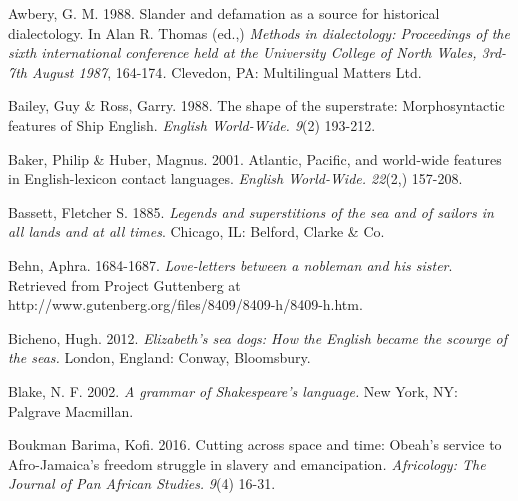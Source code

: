 \begin{styleStandard}
Awbery, G. M. 1988. Slander and defamation as a source for historical dialectology. In Alan R. Thomas (ed.,) \textit{Methods in dialectology: Proceedings of the sixth international conference held at the University College of North Wales, 3rd-7th August 1987}, 164-174\textit{.} Clevedon, PA: Multilingual Matters Ltd.
\end{styleStandard}


\begin{styleStandard}
Bailey, Guy \& Ross, Garry. 1988. The shape of the superstrate: Morphosyntactic features of Ship English. \textit{English World-Wide. 9}(2) 193-212.
\end{styleStandard}


\begin{styleStandard}
Baker, Philip \& Huber, Magnus. 2001. Atlantic, Pacific, and world-wide features in English-lexicon contact languages. \textit{English World-Wide. 22}(2,) 157-208.
\end{styleStandard}


\begin{styleStandard}
Bassett, Fletcher S. 1885. \textit{Legends and superstitions of the sea and of sailors in all lands and at all times}. Chicago, IL: Belford, Clarke \& Co. 
\end{styleStandard}


\begin{styleStandard}
Behn, Aphra. 1684-1687. \textit{Love-letters between a nobleman and his sister}. Retrieved from Project Guttenberg at http://www.gutenberg.org/files/8409/8409-h/8409-h.htm.
\end{styleStandard}


\begin{styleStandard}
Bicheno, Hugh. 2012. \textit{Elizabeth’s sea dogs: How the English became the scourge of the seas. }London, England: Conway, Bloomsbury.
\end{styleStandard}


\begin{styleStandard}
Blake, N. F. 2002. \textit{A grammar of Shakespeare’s language. }New York, NY: Palgrave Macmillan.
\end{styleStandard}


\begin{styleStandard}
Boukman Barima, Kofi. 2016\textit{. }Cutting across space and time: Obeah’s service to Afro-Jamaica’s freedom struggle in slavery and emancipation\textit{. Africology: The Journal of Pan African Studies.} \textit{9}(4) 16-31.
\end{styleStandard}



